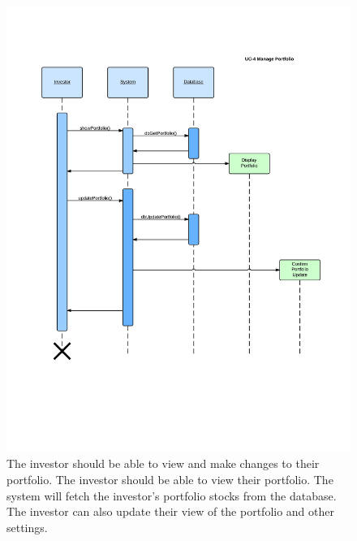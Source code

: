 \begin{figure}[H]
\centering
\includegraphics[width=5.5in]{./img/inter/uc4.jpg}
\caption
{The investor should be able to view and
make changes to their portfolio. The investor should be able to view their
portfolio. The system will fetch the investor’s portfolio stocks from the
database. The investor can also update their view of the portfolio and other
settings.}
\end{figure}



